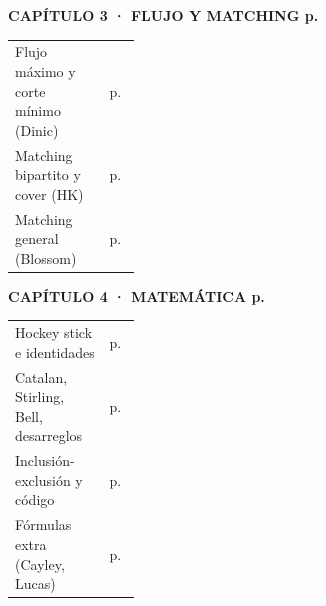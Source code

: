 \begin{minipage}[t]{0.325\linewidth}
{\sffamily\bfseries\footnotesize CAPÍTULO 3 · FLUJO Y MATCHING
\hfill p.\,\pageref{sec:flujo}}\par\vspace{1pt}
{\scriptsize
\begin{tabularx}{\linewidth}{@{}X>{\raggedleft\arraybackslash}p{0.25\linewidth}@{}}
Flujo máximo y corte mínimo (Dinic) & p.\,\pageref{rec:dinic}\\
Matching bipartito y cover (HK) & p.\,\pageref{rec:hopcroft}\\
Matching general (Blossom) & p.\,\pageref{rec:blossom}\\
\end{tabularx}}
{\sffamily\bfseries\footnotesize CAPÍTULO 4 · MATEMÁTICA
\hfill p.\,\pageref{sec:mate}}\par\vspace{1pt}
{\scriptsize
\begin{tabularx}{\linewidth}{@{}X>{\raggedleft\arraybackslash}p{0.25\linewidth}@{}}
Hockey stick e identidades & p.\,\pageref{rec:binomio}\\
Catalan, Stirling, Bell, desarreglos & p.\,\pageref{rec:catalan}\\
Inclusión-exclusión y código & p.\,\pageref{rec:ie}\\
Fórmulas extra (Cayley, Lucas) & p.\,\pageref{rec:extras}\\
\end{tabularx}}
\end{minipage}